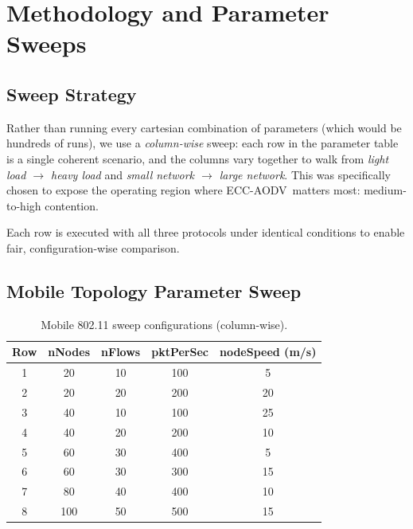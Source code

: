 \documentclass[11pt,a4paper]{article}
\newcommand{\ecc}{ECC-AODV}
\begin{document}
\section{Methodology and Parameter Sweeps}
\label{sec:methodology}

\subsection{Sweep Strategy}

Rather than running every cartesian combination of parameters (which would be
hundreds of runs), we use a \textit{column-wise} sweep: each row in the
parameter table is a single coherent scenario, and the columns vary together
to walk from \emph{light load $\to$ heavy load} and \emph{small network $\to$
large network}. This was specifically chosen to expose the operating region
where \ecc\ matters most: medium-to-high contention.

Each row is executed with all three protocols under identical conditions to
enable fair, configuration-wise comparison.

\subsection{Mobile Topology Parameter Sweep}

\begin{table}[h]
\centering
\caption{Mobile 802.11 sweep configurations (column-wise).}
\label{tab:sweep-mobile}
\small
\begin{tabular}{c c c c c}
\toprule
\textbf{Row} & \textbf{nNodes} & \textbf{nFlows} & \textbf{pktPerSec} & \textbf{nodeSpeed (m/s)} \\
\midrule
1 & 20  & 10 & 100 & 5  \\
2 & 20  & 20 & 200 & 20 \\
3 & 40  & 10 & 100 & 25 \\
4 & 40  & 20 & 200 & 10 \\
5 & 60  & 30 & 400 & 5  \\
6 & 60  & 30 & 300 & 15 \\
7 & 80  & 40 & 400 & 10 \\
8 & 100 & 50 & 500 & 15 \\
\bottomrule
\end{tabular}
\end{table}
\end{document}
